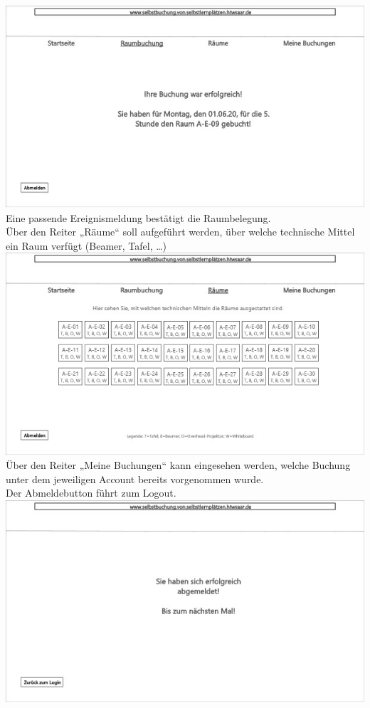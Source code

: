 \documentclass[a4paper,12pt]{article}
\begin{document}
\includegraphics{Bilder/UI7}\label{UI_7}\\

Eine passende Ereignismeldung bestätigt die Raumbelegung.\\
Über den Reiter „Räume“ soll aufgeführt werden, über welche technische Mittel ein Raum verfügt (Beamer, Tafel, …)\\

\includegraphics{Bilder/UI8}\label{UI_8}\\

Über den Reiter „Meine Buchungen“ kann eingesehen werden, welche Buchung unter dem jeweiligen Account bereits vorgenommen wurde.\\
Der Abmeldebutton führt zum Logout.\\

\includegraphics{Bilder/UI9}\label{UI_9}\\
\end{document}
